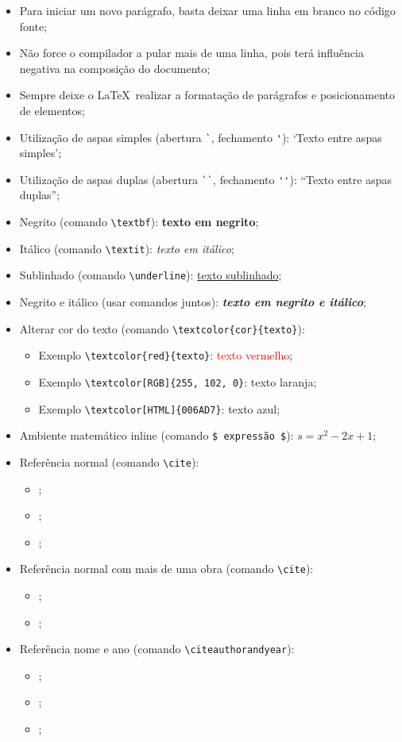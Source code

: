 \begin{itemize}
	\item Para iniciar um novo parágrafo, basta deixar uma linha em branco no código fonte;
	\item Não force o compilador a pular mais de uma linha, pois terá influência negativa na composição do documento;
	\item Sempre deixe o \LaTeX\ realizar a formatação de parágrafos e posicionamento de elementos;
	\item Utilização de aspas simples (abertura \verb|`|, fechamento \verb|'|): `Texto entre aspas simples';
	\item Utilização de aspas duplas (abertura \verb|``|, fechamento \verb|''|): ``Texto entre aspas duplas'';
	\item Negrito (comando \verb|\textbf|): \textbf{texto em negrito};
	\item Itálico (comando \verb|\textit|): \textit{texto em itálico};
	\item Sublinhado (comando \verb|\underline|): \underline{texto sublinhado};
	\item Negrito e itálico (usar comandos juntos): \textbf{\textit{texto em negrito e itálico}};
	\item Alterar cor do texto (comando \verb|\textcolor{cor}{texto}|):
	\begin{itemize}
		\item Exemplo \verb|\textcolor{red}{texto}|: \textcolor{red}{texto vermelho};
		\item Exemplo \verb|\textcolor[RGB]{255, 102, 0}|: \textcolor[RGB]{255, 102, 0}{texto laranja};
		\item Exemplo \verb|\textcolor[HTML]{006AD7}|: \textcolor[HTML]{006AD7}{texto azul};
	\end{itemize}
	\item Ambiente matemático inline (comando \verb|$ expressão $|): $s = x^2-2x +1$;
	\item Referência normal (comando \verb|\cite|):
	\begin{itemize}
		\item \cite{Agaisse1995};
		\item \cite{Abedi2014};
		\item \cite{BtNomenclature2016};
	\end{itemize}
	\item Referência normal com mais de uma obra (comando \verb|\cite|):
	\begin{itemize}
		\item \cite{Abedi2014, Agaisse1995};
		\item \cite{AgapitoTenfen2014, BtNomenclature2016, Nelson2014};
	\end{itemize}
	\item Referência nome e ano (comando \verb|\citeauthorandyear|):
	\begin{itemize}
		\item {};
		\item {};
		\item {};
	\end{itemize}
\end{itemize}


